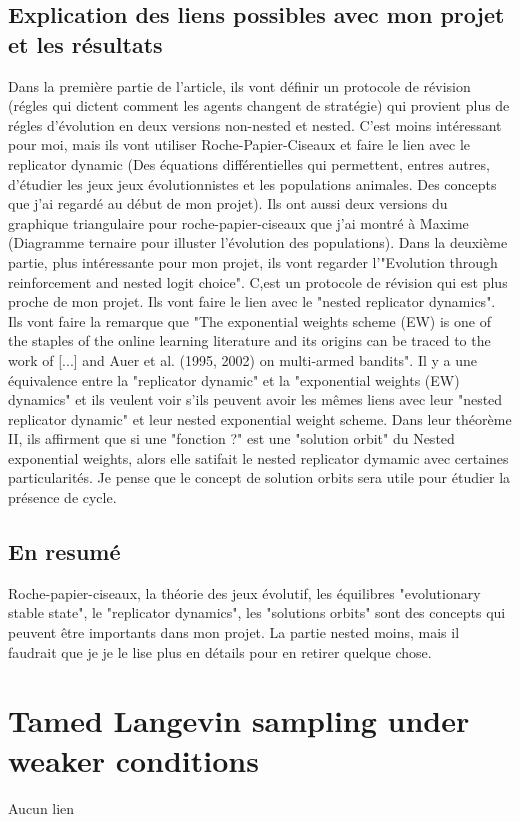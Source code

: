 \documentclass{article}
\begin{document}
\subsection{Explication des liens possibles avec mon projet et les résultats}
Dans la première partie de l'article, ils vont définir un protocole de révision (régles qui dictent comment les agents changent de stratégie) qui provient plus de régles d'évolution en deux versions non-nested et nested. C'est moins intéressant pour moi, mais ils vont utiliser Roche-Papier-Ciseaux et faire le lien avec le replicator dynamic (Des équations différentielles qui permettent, entres autres, d'étudier les jeux jeux évolutionnistes et les populations animales. Des concepts que j'ai regardé au début de mon projet). Ils ont aussi deux versions du graphique triangulaire pour roche-papier-ciseaux que j'ai montré à Maxime (Diagramme ternaire pour illuster l'évolution des populations). 
Dans la deuxième partie, plus intéressante pour mon projet, ils vont regarder l'"Evolution through reinforcement and nested logit choice". C,est un protocole de révision qui est plus proche de mon projet. Ils vont faire le lien avec le "nested replicator dynamics". Ils vont faire la remarque que "The exponential weights scheme (EW) is one of the staples of the online learning literature and its origins can be traced to the work of [...] and Auer et al. (1995, 2002) on multi-armed bandits". Il y a une équivalence entre la "replicator dynamic" et la "exponential weights (EW) dynamics" et ils veulent voir s'ils peuvent avoir les mêmes liens avec leur "nested replicator dynamic" et leur nested exponential weight scheme. Dans leur théorème II, ils affirment que si une "fonction ?" est une "solution orbit" du Nested exponential weights, alors elle satifait le nested replicator dymamic avec certaines particularités. Je pense que le concept de solution orbits sera utile pour étudier la présence de cycle.

\subsection{En resumé}
Roche-papier-ciseaux, la théorie des jeux évolutif, les équilibres "evolutionary stable state", le "replicator dynamics", les "solutions orbits" sont des concepts qui peuvent être importants dans mon projet. La partie nested moins, mais il faudrait que je je le lise plus en détails pour en retirer quelque chose. 

\section{Tamed Langevin sampling under weaker conditions\cite{lytras_tamed_2024}}
Aucun lien
\end{document}
